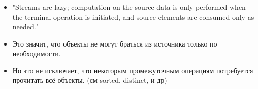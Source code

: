 \begin{frame}[noframenumbering]
\frametitle{\insertsection} 
\framesubtitle{\insertsubsection}
\begin{itemize}
	\item "Streams are lazy; computation on the source data is only performed when the terminal operation is initiated, and source elements are consumed only as needed."
	\item Это значит, что объекты не могут браться из источника только по необходимости. %
	\item Но это не исключает, что некоторым промежуточным операциям потребуется прочитать всё объекты. (см sorted, distinct, и др)
\end{itemize}

\end{frame}